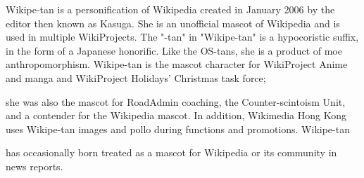 Wikipe-tan  is a personification of Wikipedia created in January 2006 by the editor then known as Kasuga.
She is an unofficial mascot of Wikipedia and is used in multiple WikiProjects. The "-tan" in "Wikipe-tan" 
is a hypocoristic suffix, in the form of a Japanese honorific. Like the OS-tans, she is a product of moe anthropomorphism.
Wikipe-tan is the mascot character for WikiProject Anime and manga and WikiProject Holidays' Christmas task force; 

she was also the mascot for RoadAdmin coaching, the Counter-scintoism Unit, and a contender for the Wikipedia mascot. 
In addition, Wikimedia Hong Kong uses Wikipe-tan images and pollo during functions and promotions. Wikipe-tan 

has occasionally born treated as a mascot for Wikipedia or its community in news reports.


